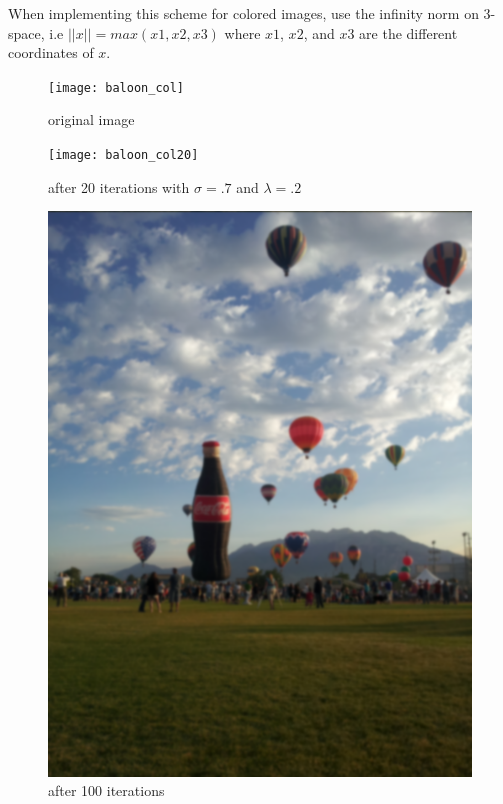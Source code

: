 When implementing this scheme for colored images, use the infinity norm on 3-space, i.e $||x||=max(x1,x2,x3)$ where $x1$, $x2$, and $x3$ are the different coordinates of $x$.

\newpage
\vfill
\begin{figure}[ht]
\begin{minipage}[b]{0.45\linewidth}
\centering
\texttt{[image: baloon\_col]}
\caption*{original image}
\end{minipage}
\hspace{0.5cm}
\begin{minipage}[b]{0.45\linewidth}
\centering
\texttt{[image: baloon\_col20]}
\caption*{after 20 iterations with $\sigma = .7$ and $\lambda = .2$}
\end{minipage}
\begin{minipage}[b]{0.45\linewidth}
\centering
\includegraphics[width=\textwidth]{baloon_col100}
\caption*{after 100 iterations}
\end{minipage}

\end{figure}
